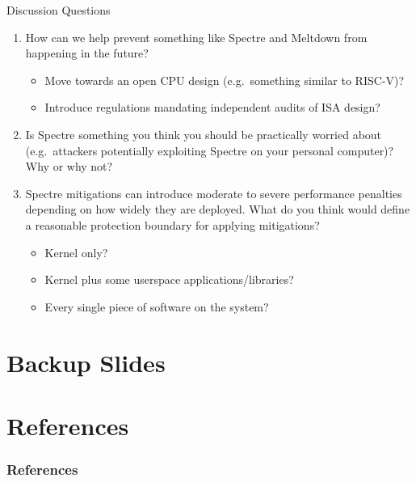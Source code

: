 \documentclass[10pt, dvipsnames, aspectratio=169]{beamer}
\begin{document}
\begin{frame}[c]{Discussion Questions}
  \begin{enumerate}
    \item How can we help prevent something like Spectre and Meltdown from happening in the future?
    \begin{itemize}
      \item Move towards an open CPU design (e.g.~something similar to RISC-V)?
      \item Introduce regulations mandating independent audits of ISA design?
    \end{itemize}

    \vfill
    \item Is Spectre something you think you should be practically worried about (e.g.~attackers potentially exploiting Spectre on your personal computer)? Why or why not?

    \vfill
    \item Spectre mitigations can introduce moderate to severe performance penalties depending on how widely they are deployed. What do you think would define a reasonable protection boundary for applying mitigations?
    \begin{itemize}
      \item Kernel only?
      \item Kernel plus some userspace applications/libraries?
      \item Every single piece of software on the system?
    \end{itemize}
  \end{enumerate}
\end{frame}

\appendix

\section{Backup Slides}

\section{References}

\nocite{*}
\begin{frame}
  \frametitle{References}
  \sloppy
  \printbibliography
\end{frame}
\end{document}
